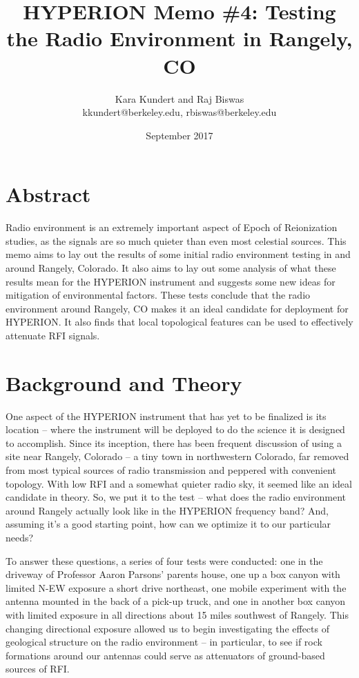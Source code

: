 \documentclass[11pt]{article}
\makeatletter
\newcommand{\thetitle}{HYPERION Memo \#4: Testing the Radio Environment in 
Rangely, CO}
\newcommand{\theauthor}{Kara Kundert and Raj Biswas}
\newcommand{\theauthorsemail}{kkundert@berkeley.edu, rbiswas@berkeley.edu}
\newcommand{\thedate}{September 2017}
\makeatother
\begin{document}
\title{
    \sffamily\bfseries\huge
    \thetitle \\
}
\author{
    \sffamily\theauthor \\
    \sffamily\theauthorsemail
}
\date{\thedate}
\maketitle
\sloppy

\section{Abstract}

Radio environment is an extremely important aspect of Epoch of Reionization 
studies, as the signals are so much quieter than even most celestial sources. 
This memo aims to lay out the results of some initial radio environment testing 
in and around Rangely, Colorado. It also aims to lay out some analysis of what 
these results mean for the HYPERION instrument and suggests some new ideas for 
mitigation of environmental factors. These tests conclude that the radio 
environment around Rangely, CO makes it an ideal candidate for deployment for 
HYPERION. It also finds that local topological features can be used to 
effectively attenuate RFI signals.

\section{Background and Theory}

One aspect of the HYPERION instrument that has yet to be finalized is its 
location -- where the instrument will be deployed to do the science it is 
designed to accomplish. Since its inception, there has been frequent discussion 
of using a site near Rangely, Colorado -- a tiny town in northwestern Colorado, 
far removed from most typical sources of radio transmission and peppered with 
convenient topology. With low RFI and a somewhat quieter radio sky, it seemed 
like an ideal candidate in theory. So, we put it to the test -- what does the 
radio environment around Rangely actually look like in the HYPERION frequency 
band?  And, assuming it's a good starting point, how can we optimize it to our 
particular needs?

To answer these questions, a series of four tests were conducted: one in the 
driveway of Professor Aaron Parsons' parents house, one up a box canyon with 
limited N-EW exposure a short drive northeast, one mobile experiment with the 
antenna mounted in the back of a pick-up truck, and one in another box canyon 
with limited exposure in all directions about 15 miles southwest of Rangely.  
This changing directional exposure allowed us to begin investigating the 
effects of geological structure on the radio environment -- in particular, to 
see if rock formations around our antennas could serve as attenuators of 
ground-based sources of RFI. 
\end{document}
